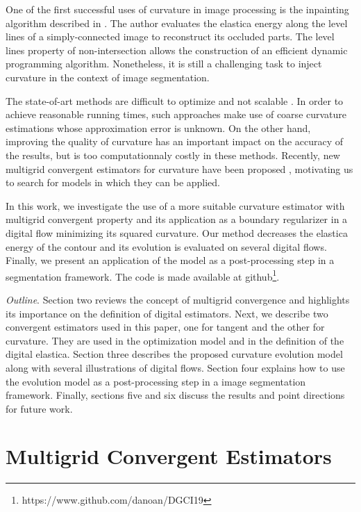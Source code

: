 \documentclass[runningheads]{llncs}
\begin{document}
One of the first successful uses of curvature in image processing is the inpainting algorithm described in \cite{masnou98}. The author evaluates the elastica energy along the level lines of a simply-connected image to reconstruct its occluded parts. The level lines property of non-intersection allows the construction of an efficient dynamic programming algorithm. Nonetheless, it is still a challenging task to inject curvature in the context of image segmentation. 

The state-of-art methods are difficult to optimize and  not scalable \cite{zehiry10,schoenemann09,nieuwenhuis14}. In order to achieve reasonable running times, such approaches make use of coarse curvature estimations whose approximation error is unknown. On the other hand, improving the quality of curvature has an important impact on the accuracy of the results, but is too computationnaly costly in these methods. Recently, new multigrid convergent estimators for curvature have been proposed \cite{schindele17,coeurjolly13,roussillon11}, motivating us to search for models in which they can be applied.

In this work, we investigate the use of a more suitable curvature estimator with multigrid convergent property and its application as a boundary regularizer in a digital flow minimizing its squared curvature. Our method decreases the elastica energy of the contour and its evolution is evaluated on several digital flows. Finally, we present an application of the model as a post-processing step in a segmentation framework. The code is made available at github\footnote{https://www.github.com/danoan/DGCI19}.

\textit{Outline}. Section two reviews the concept of multigrid convergence and highlights its importance on the definition of digital estimators. Next, we describe two convergent estimators used in this paper, one for tangent and the other for curvature. They are used in the optimization model and in the definition of the digital elastica. Section three describes the proposed curvature evolution model along with several illustrations of digital flows. Section four explains how to use the evolution model as a post-processing step in a image segmentation framework. Finally, sections five and six discuss the results and point directions for future work.




\section{Multigrid Convergent Estimators}
\end{document}
